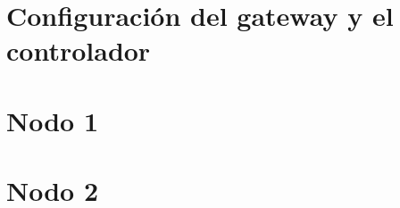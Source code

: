 \graphicspath{{./2/}}

\chapter{Configuración del gateway y el controlador}



\chapter{Nodo 1}



\chapter{Nodo 2}

